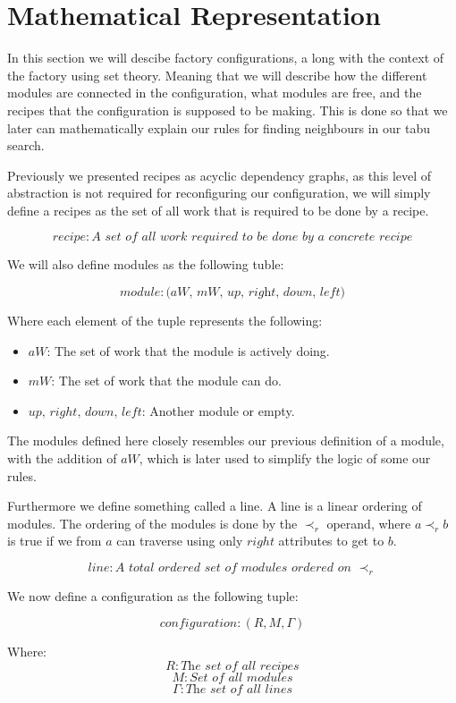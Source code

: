 \section{Mathematical Representation}

In this section we will descibe factory configurations, a long with the context of the factory using set theory. Meaning that we will describe how the different modules are connected in the configuration, what modules are free, and the recipes that the configuration is supposed to be making. This is done so that we later can mathematically explain our rules for finding neighbours in our tabu search.

Previously we presented recipes as acyclic dependency graphs, as this level of abstraction is not required for reconfiguring our configuration, we will simply define a recipes as the set of all work that is required to be done by a recipe.

\[recipe: \textit{A set of all work required to be done by a concrete recipe}\]

\noindent We will also define modules as the following tuble:

\[module: \textit{(aW, mW, up, right, down, left)}\]

\noindent Where each element of the tuple represents the following:
\begin{itemize}
\item $aW$: The set of work that the module is actively doing.
\item $mW$: The set of work that the module can do.
\item $up,\, right,\, down,\, left$: Another module or empty.
\end{itemize}

The modules defined here closely resembles our previous definition of a module, with the addition of $aW$, which is later used to simplify the logic of some our rules.

Furthermore we define something called a line. A line is a linear ordering of modules. The ordering of the modules is done by the $\prec_r$ operand, where $a \prec_r b$ is true if we from $a$ can traverse using only $right$ attributes to get to $b$.

\[line: \textit{A total ordered set of modules ordered on } \prec_r\]

We now define a configuration as the following tuple:

\[configuration: (R, M, \Gamma)\]

Where:
\[R: \textit{The set of all recipes}\]
\[M: \textit{Set of all modules}\]
\[\Gamma: \textit{The set of all lines}\]



